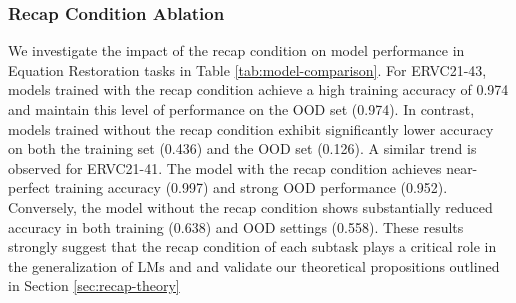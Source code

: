 \subsubsection{Recap Condition Ablation}
We investigate the impact of the recap condition on model performance in Equation Restoration tasks in Table \ref{tab:model-comparison}. For ERVC21-43, models trained with the recap condition achieve a high training accuracy of 0.974 and maintain this level of performance on the OOD set (0.974).  In contrast, models trained without the recap condition exhibit significantly lower accuracy on both the training set (0.436) and the OOD set (0.126). A similar trend is observed for ERVC21-41. The model with the recap condition achieves near-perfect training accuracy (0.997) and strong OOD performance (0.952).  Conversely, the model without the recap condition shows substantially reduced accuracy in both training (0.638) and OOD settings (0.558). These results strongly suggest that the recap condition of each subtask plays a critical role in the generalization of LMs and and validate our theoretical propositions outlined in Section \ref{sec:recap-theory}
\begin{table}[]
\vspace{-1em}
\caption{Model performance comparisons on the with and without recap condition on the Equation Restoration Task, where }
    \centering
\label{tab:model-comparison}
 \vspace{-1.em}
\end{table}



